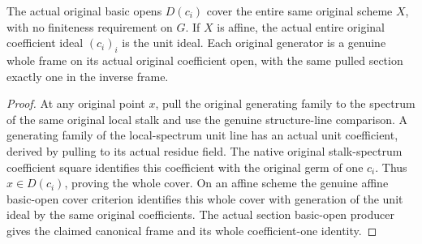 \begin{theorem}
\label{thm:fc-original-generator-coefficient-cover}
\leanok
{}
The actual original basic opens $D(c_i)$ cover the entire same
original scheme $X$, with no finiteness requirement on $G$. If $X$ is
affine, the actual entire original coefficient ideal $(c_i)_i$ is the
unit ideal. Each original generator is a genuine whole frame on its
actual original coefficient open, with the same pulled section
exactly one in the inverse frame.
\end{theorem}
\begin{proof}
At any original point $x$, pull the original generating family to the
spectrum of the same original local stalk and use the genuine
structure-line comparison. A generating family of the local-spectrum
unit line has an actual unit coefficient, derived by pulling to its
actual residue field. The native original stalk-spectrum coefficient
square identifies this coefficient with the original germ of one
$c_i$. Thus $x\in D(c_i)$, proving the whole cover. On an affine
scheme the genuine affine basic-open cover criterion identifies this
whole cover with generation of the unit ideal by the same original
coefficients. The actual section basic-open producer gives the
claimed canonical frame and its whole coefficient-one identity.
\end{proof}

